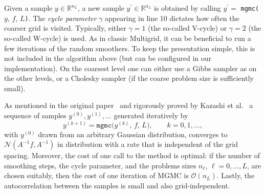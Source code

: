 \documentclass[
fontsize=11pt,
paper=a4,
numbers=noenddot
]{scrartcl}
\begin{document}
Given a sample $y \in \mathbb{R}^{n_L}$, a new sample $y^\prime \in \mathbb{R}^{n_L}$ is obtained by calling $y^\prime =$ \texttt{mgmc(}$y,\, f,\, L$\texttt{)}. The \emph{cycle parameter} $\gamma$ appearing in line 10 dictates how often the coarser grid is visited. Typically, either $\gamma = 1$ (the so-called V-cycle) or $\gamma = 2$ (the so-called W-cycle) is used. As in classic Multigrid, it can be beneficial to run a few iterations of the random smoothers. To keep the presentation simple, this is not included in the algorithm above (but can be configured in our implementation). On the coarsest level one can either use a Gibbs sampler as on the other levels, or a Cholesky sampler (if the coarse problem size is sufficiently small).

As mentioned in the original paper~\cite{goodmansokal} and rigorously proved by Kazashi et al.~\cite{kazashimuellerscheichl} a sequence of samples $y^{(0)}, y^{(1)}, \dotsc$ generated iteratively by 
\begin{equation*}
    y^{(k+1)} = \texttt{mgmc(}y^{(k)},\, f,\, L\texttt{)},\qquad k = 0,1,\dotsc,
\end{equation*}
with $y^{(0)}$ drawn from an arbitrary Gaussian distribution, converges to $\mathcal{N}(A^{-1}f, A^{-1})$ in distribution with a rate that is independent of the grid spacing. Moreover, the cost of one call to the method is optimal: if the number of smoothing steps, the cycle parameter, and the problems sizes $n_\ell$, $\ell = 0,\dotsc,L$, are chosen suitably, then the cost of one iteration of MGMC is $\mathcal{O}(n_L)$. Lastly, the autocorrelation between the samples is small and also grid-independent.




\end{document}
